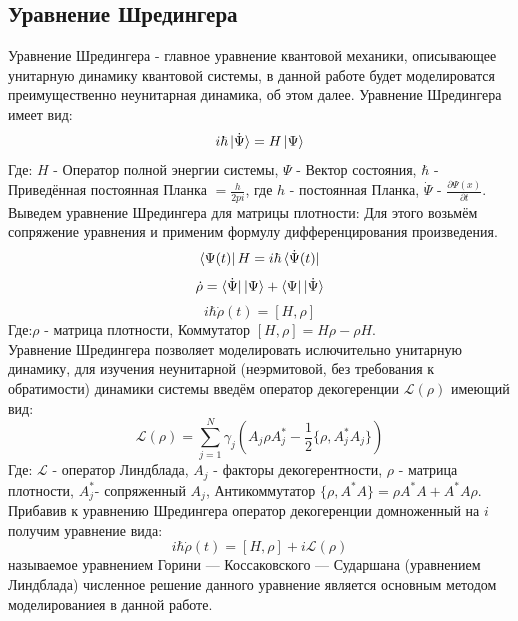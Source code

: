 \documentclass[12pt, a4paper]{article}
\begin{document}
\subsection{Уравнение Шредингера}
\qquad Уравнение Шредингера - главное уравнение квантовой механики, описывающее унитарную динамику квантовой системы, в данной работе будет моделироватся преимущественно неунитарная динамика, об этом далее.\newline
Уравнение Шредингера имеет вид:
\[i\hbar\ket{\dot\Psi}=H\ket{\Psi}\]
Где:\newline
$H$ - Оператор полной энергии системы, \newline
$\Psi$ - Вектор состояния,\newline
$\hbar$ - Приведённая постоянная Планка $= \frac{h}{2pi}$, где $h$ - постоянная Планка,\newline
$\dot\Psi$ - $\frac{\partial \Psi(x)}{\partial t}$. \newline \null\qquad
Выведем уравнение Шредингера для матрицы плотности:\newline
Для этого возьмём сопряжение уравнения и применим формулу дифференцирования произведения.
\[\bra{\Psi(t)}H=i\hbar\bra{\dot\Psi(t)}\]
\[\dot\rho=\bra{\dot\Psi}\ket{\Psi}+\bra{\Psi}\ket{\dot\Psi}\]
\[i\hbar\dot\rho(t)=[H,\rho]\]
Где:\newline $\rho$ - матрица плотности, \newline Коммутатор $[H,\rho]=H\rho-\rho H$.\newline
\\ 
\null\qquad Уравнение Шредингера позволяет моделировать ислючительно унитарную динамику, для изучения неунитарной (неэрмитовой, без требования к обратимости) динамики системы введём оператор декогеренции $\mathcal{L}(\rho)$ имеющий вид: \[\mathcal{L}(\rho)=\sum_{j=1}^N\gamma_j(A_j\rho A^*_j-\frac{1}{2}\{\rho,A_j^*A_j\})\]
Где:\newline
$\mathcal{L}$ - оператор Линдблада,\newline 
$A_j$ - факторы декогерентности,\newline 
$\rho$ - матрица плотности,\newline 
$A^*_j$- сопряженный $A_j$, \newline
Антикоммутатор $\{\rho,A^*A\}=\rho A^*A+A^* A\rho$.
\newline \null\qquad
Прибавив к уравнению Шредингера оператор декогеренции домноженный на $i$ получим уравнение вида:\[i\hbar\dot\rho(t)=[H,\rho]+i\mathcal{L}(\rho)\]
называемое уравнением Горини — Коссаковского — Сударшана (уравнением Линдблада) численное решение данного уравнение является основным методом моделированиея в данной работе.
\end{document}
